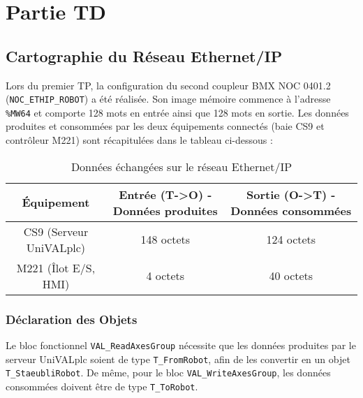 \section{Partie TD}

\subsection{Cartographie du Réseau Ethernet/IP}

Lors du premier TP, la configuration du second coupleur BMX NOC 0401.2 (\texttt{NOC\_ETHIP\_ROBOT}) a été réalisée. Son image mémoire commence à l'adresse \texttt{\%MW64} et comporte 128 mots en entrée ainsi que 128 mots en sortie. Les données produites et consommées par les deux équipements connectés (baie CS9 et contrôleur M221) sont récapitulées dans le tableau ci-dessous :

\begin{table}[h]
\centering
\begin{tabular}{|c|c|c|}
\hline
\textbf{Équipement} & \textbf{Entrée (T->O) - Données produites} & \textbf{Sortie (O->T) - Données consommées} \\ \hline
CS9 (Serveur UniVALplc) & 148 octets & 124 octets \\ \hline
M221 (Îlot E/S, HMI) & 4 octets & 40 octets \\ \hline
\end{tabular}
\caption{Données échangées sur le réseau Ethernet/IP}
\end{table}

\begin{UPSTIactivite}

\vspace{13cm}
\end{UPSTIactivite}
\pagebreak

\subsubsection{Déclaration des Objets}
\label{sec:declarationObjets}
Le bloc fonctionnel \texttt{VAL\_ReadAxesGroup} nécessite que les données produites par le serveur UniVALplc soient de type \texttt{T\_FromRobot}, afin de les convertir en un objet \texttt{T\_StaeubliRobot}. De même, pour le bloc \texttt{VAL\_WriteAxesGroup}, les données consommées doivent être de type \texttt{T\_ToRobot}.

